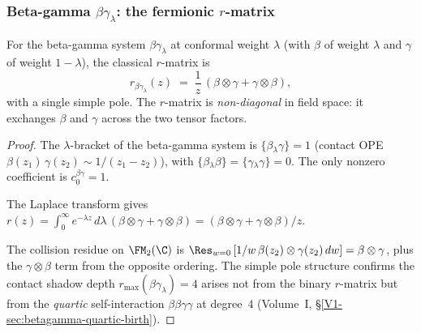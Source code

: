 \subsubsection{Beta-gamma $\beta\gamma_\lambda$: the fermionic
$r$-matrix}

\begin{proposition}
For the beta-gamma system $\beta\gamma_\lambda$ at conformal weight
$\lambda$ (with $\beta$ of weight $\lambda$ and $\gamma$ of weight
$1 - \lambda$), the classical $r$-matrix is
\begin{equation}
r_{\beta\gamma_\lambda}(z)
\;=\;
\frac{1}{z}\, (\beta \otimes \gamma + \gamma \otimes \beta),
\end{equation}
with a single simple pole. The $r$-matrix is \emph{non-diagonal}
in field space: it exchanges $\beta$ and $\gamma$ across the two
tensor factors.
\end{proposition}

\begin{proof}
The $\lambda$-bracket of the beta-gamma system is
$\{\beta {}_\lambda \gamma\} = 1$ (contact OPE
$\beta(z_1)\, \gamma(z_2) \sim 1/(z_1 - z_2)$), with
$\{\beta {}_\lambda \beta\} = \{\gamma {}_\lambda \gamma\} = 0$.
The only nonzero coefficient is $c_0^{\beta\gamma} = 1$.

The Laplace transform gives
$r(z) = \int_0^\infty e^{-\lambda z}\, d\lambda\,
(\beta \otimes \gamma + \gamma \otimes \beta)
= (\beta \otimes \gamma + \gamma \otimes \beta)/z$.

The collision residue on $\FM_2(\C)$ is
$\Res_{w=0}\, [1/w\, \beta(z_2) \otimes \gamma(z_2)\, dw]
= \beta \otimes \gamma$, plus the $\gamma \otimes \beta$
term from the opposite ordering. The simple pole structure
confirms the contact shadow depth
$r_{\max}(\beta\gamma_\lambda) = 4$ arises not from the
binary $r$-matrix but from the \emph{quartic} self-interaction
$\beta\beta\gamma\gamma$ at degree~$4$ (Volume~I,
\S\ref*{V1-sec:betagamma-quartic-birth}).
\end{proof}

